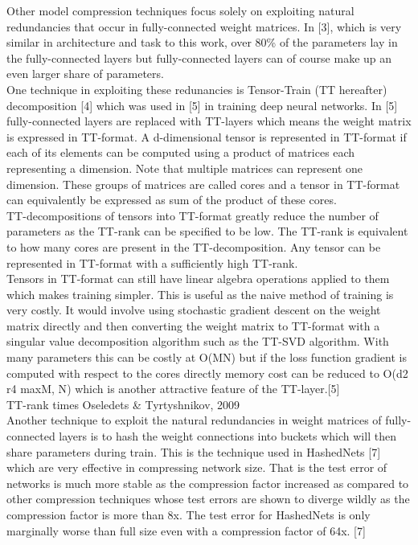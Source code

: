 \documentclass{article}
\begin{document}
Other model compression techniques focus solely on exploiting natural redundancies that occur in fully-connected weight matrices. In [3], which is very similar in architecture and task to this work, over 80\% of the parameters lay in the fully-connected layers but fully-connected layers can of course make up an even larger share of parameters.\\

One technique in exploiting these redunancies is Tensor-Train (TT hereafter) decomposition [4] which was used in [5] in training deep neural networks. In [5] fully-connected layers are replaced with TT-layers which means the weight matrix is expressed in TT-format. A d-dimensional tensor is represented in TT-format if each of its elements can be computed using a product of matrices each representing a dimension. Note that multiple matrices can represent one dimension. These groups of matrices are called cores and a tensor in TT-format can equivalently be expressed as sum of the product of these cores. \\

TT-decompositions of tensors into TT-format greatly reduce the number of parameters as the TT-rank can be specified to be low. The TT-rank is equivalent to how many cores are present in the TT-decomposition. Any tensor can be represented in TT-format with a sufficiently high TT-rank.\\

Tensors in TT-format can still have linear algebra operations applied to them which makes training simpler. This is useful as the naive method of training is very costly. It would involve using stochastic gradient descent on the weight matrix directly and then converting the weight matrix to TT-format with a singular value decomposition algorithm such as the TT-SVD algorithm. With many parameters this can be costly at O(MN) but if the loss function gradient is computed with respect to the cores directly memory cost can be reduced to O(d2 r4 max{M, N}) which is another attractive feature of the TT-layer.[5]\\

TT-rank times Oseledets \& Tyrtyshnikov, 2009\\

Another technique to exploit the natural redundancies in weight matrices of fully-connected layers is to hash the weight connections into buckets which will then share parameters during train. This is the technique used in HashedNets [7] which are very effective in compressing network size. That is the test error of networks is much more stable as the compression factor increased as compared to other compression techniques whose test errors are shown to diverge wildly as the compression factor is more than 8x. The test error for HashedNets is only marginally worse than full size even with a compression factor of 64x. [7]\\
\end{document}
